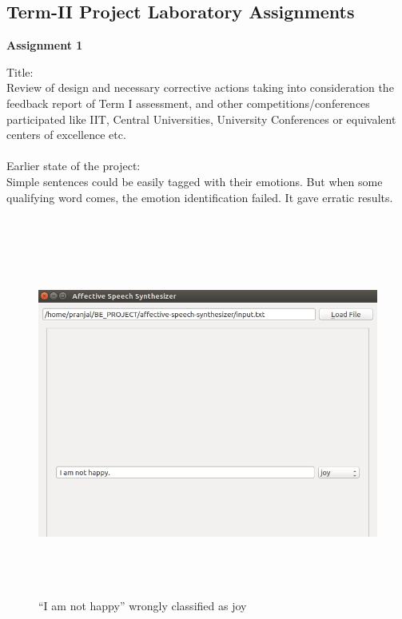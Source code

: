 \documentclass[oneside,a4paper,12pt]{book}
\begin{document}
\begin{appendices}
\chapter{ Term-II Project Laboratory Assignments}
\begin{center}
	\textbf{Assignment 1}
\end{center}
Title: \\
Review of design and necessary corrective actions taking into consideration the feedback report of Term I assessment, and other competitions/conferences participated like IIT, Central Universities, University Conferences or equivalent centers of excellence etc. \\ \\
Earlier state of the project:\\
Simple sentences could be easily tagged with their emotions. But when some qualifying word comes, the emotion identification failed. It gave erratic results. \\\\
\begin{figure}[ht]
	\centering
	\includegraphics[width=400pt, height=340pt]{earlier.png}
	\caption{“I am not happy” wrongly classified as joy}
	\label{fig:“I am not happy” wrongly classified as joy}
\end{figure}


\end{appendices}
\end{document}
